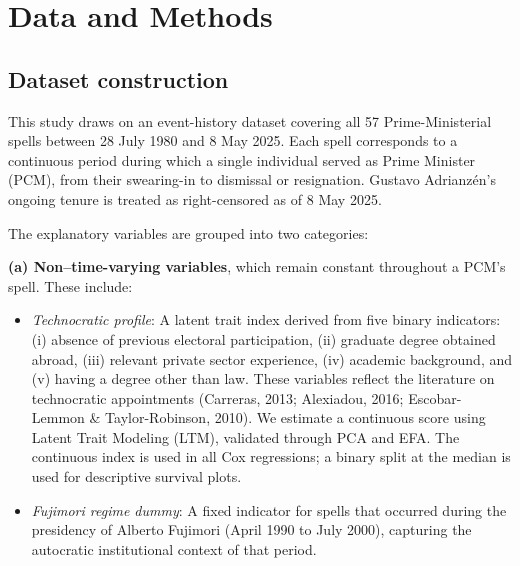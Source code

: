 \documentclass[a4paper, 12pt]{article}
\begin{document}
% 
% 
% 



\section{Data and Methods}

\subsection{Dataset construction}


This study draws on an event-history dataset covering all 57 Prime-Ministerial spells between 28 July 1980 and 8 May 2025. Each spell corresponds to a continuous period during which a single individual served as Prime Minister (PCM), from their swearing-in to dismissal or resignation. Gustavo Adrianzén’s ongoing tenure is treated as right-censored as of 8 May 2025.

The explanatory variables are grouped into two categories:

\textbf{(a) Non–time-varying variables}, which remain constant throughout a PCM’s spell. These include:

\begin{itemize}
    \item \textit{Technocratic profile}: A latent trait index derived from five binary indicators: (i) absence of previous electoral participation, (ii) graduate degree obtained abroad, (iii) relevant private sector experience, (iv) academic background, and (v) having a degree other than law. These variables reflect the literature on technocratic appointments (Carreras, 2013; Alexiadou, 2016; Escobar-Lemmon \& Taylor-Robinson, 2010). We estimate a continuous score using Latent Trait Modeling (LTM), validated through PCA and EFA. The continuous index is used in all Cox regressions; a binary split at the median is used for descriptive survival plots.
    
    \item \textit{Fujimori regime dummy}: A fixed indicator for spells that occurred during the presidency of Alberto Fujimori (April 1990 to July 2000), capturing the autocratic institutional context of that period.
\end{itemize}
\end{document}
